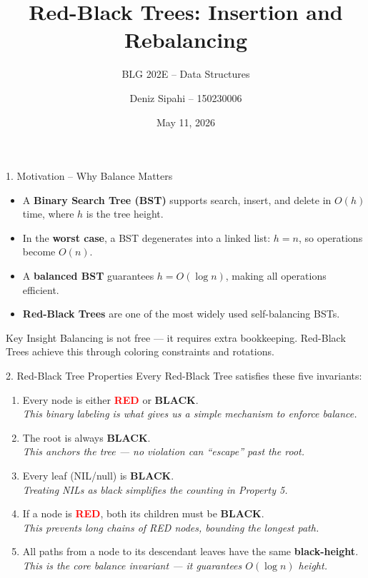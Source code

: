 \documentclass{beamer}
\title{Red-Black Trees: Insertion and Rebalancing}
\subtitle{BLG 202E -- Data Structures}
\author{Deniz Sipahi -- 150230006}
\date{May 11, 2026}
\institute{Istanbul Technical University}
\begin{document}
\begin{frame}
\titlepage
\end{frame}

\begin{frame}{1. Motivation -- Why Balance Matters}
\begin{itemize}
    \item A \textbf{Binary Search Tree (BST)} supports search, insert, and delete in $O(h)$ time, where $h$ is the tree height.
    \item In the \textbf{worst case}, a BST degenerates into a linked list: $h = n$, so operations become $O(n)$.
    \item A \textbf{balanced BST} guarantees $h = O(\log n)$, making all operations efficient.
    \item \textbf{Red-Black Trees} are one of the most widely used self-balancing BSTs.
\end{itemize}

\begin{block}{Key Insight}
Balancing is not free --- it requires extra bookkeeping. Red-Black Trees achieve this through coloring constraints and rotations.
\end{block}
\end{frame}

\begin{frame}{2. Red-Black Tree Properties}
Every Red-Black Tree satisfies these five invariants:
\begin{enumerate}
    \item Every node is either \textcolor{red}{\textbf{RED}} or \textbf{BLACK}.\\
          \textit{This binary labeling is what gives us a simple mechanism to enforce balance.}
    \item The root is always \textbf{BLACK}.\\
          \textit{This anchors the tree --- no violation can ``escape'' past the root.}
    \item Every leaf (NIL/null) is \textbf{BLACK}.\\
          \textit{Treating NILs as black simplifies the counting in Property 5.}
    \item If a node is \textcolor{red}{\textbf{RED}}, both its children must be \textbf{BLACK}.\\
          \textit{This prevents long chains of RED nodes, bounding the longest path.}
    \item All paths from a node to its descendant leaves have the same \textbf{black-height}.\\
          \textit{This is the core balance invariant --- it guarantees $O(\log n)$ height.}
\end{enumerate}
\end{frame}
\end{document}
